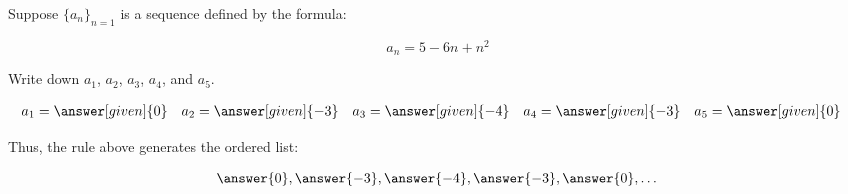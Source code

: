 \documentclass{ximera}
\author{Jim Talamo}
\begin{document}
\begin{exercise}

Suppose $\{a_n\}_{n=1}$ is a sequence defined by the formula:

\[a_n = 5-6n+n^2\]

Write down $a_1$, $a_2$, $a_3$, $a_4$, and $a_5$.

    \begin{align*}
      a_1 &= \answer[given]{0} & 
      a_2 &= \answer[given]{-3} & 
      a_3 &= \answer[given]{-4} & 
      a_4 &= \answer[given]{-3} & 
      a_5 &= \answer[given]{0} 
    \end{align*}

\begin{exercise}    
Thus, the rule above generates the ordered list:

\[
\answer{0} ,\answer{-3},\answer{-4},\answer{-3},\answer{0}, \dots
\]   

\end{exercise}
\end{exercise}
\end{document}
